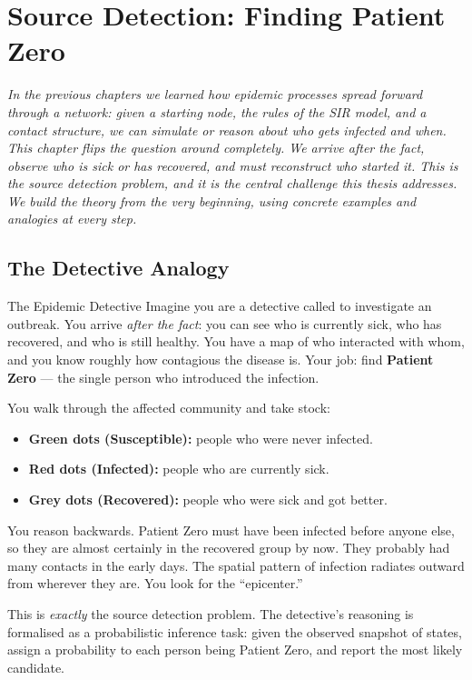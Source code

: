 
\chapter{Source Detection: Finding Patient Zero}
\label{chap:source-detection}

\textit{%
  In the previous chapters we learned how epidemic processes spread forward
  through a network: given a starting node, the rules of the SIR model, and a
  contact structure, we can simulate or reason about who gets infected and when.
  This chapter flips the question around completely. We arrive \emph{after the
  fact}, observe who is sick or has recovered, and must reconstruct who started
  it. This is the source detection problem, and it is the central challenge
  this thesis addresses. We build the theory from the very beginning, using
  concrete examples and analogies at every step.
}

\section{The Detective Analogy}
\label{sec:detective-analogy}

\begin{analogybox}{The Epidemic Detective}
Imagine you are a detective called to investigate an outbreak. You arrive
\emph{after the fact}: you can see who is currently sick, who has recovered,
and who is still healthy. You have a map of who interacted with whom, and you
know roughly how contagious the disease is. Your job: find \textbf{Patient
Zero} — the single person who introduced the infection.

You walk through the affected community and take stock:

\begin{itemize}
    \item \textbf{Green dots (Susceptible):} people who were never infected.
    \item \textbf{Red dots (Infected):} people who are currently sick.
    \item \textbf{Grey dots (Recovered):} people who were sick and got better.
\end{itemize}

You reason backwards. Patient Zero must have been infected before anyone else,
so they are almost certainly in the recovered group by now. They probably had
many contacts in the early days. The spatial pattern of infection
radiates outward from wherever they are. You look for the ``epicenter.''

This is \emph{exactly} the source detection problem. The detective's reasoning
is formalised as a probabilistic inference task: given the observed snapshot of
states, assign a probability to each person being Patient Zero, and report the
most likely candidate.
\end{analogybox}

